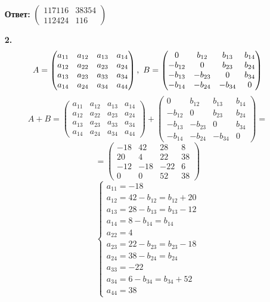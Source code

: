 \documentclass[a4paper]{article}
\newcommand{\mat}[1]{\begin{pmatrix} #1 \end{pmatrix}}
\newcommand{\case}[1]{\begin{cases} #1 \end{cases}}
\newcommand{\ts}{\text{\space}}
\begin{document}
\begin{enumerate}
    \textbf{Ответ: } $\mat{117116 & 38354 \\ 112424 & 116}$

    \item[\textbf{2.}]
    $$A = \mat{a_{11} & a_{12} & a_{13} & a_{14} \\ a_{12} & a_{22} & a_{23} & a_{24} \\ a_{13} & a_{23} & a_{33} & a_{34} \\ a_{14} & a_{24} & a_{34} & a_{44}}, \ts 
    B = \mat{0 & b_{12} & b_{13} & b_{14} \\ -b_{12} & 0 & b_{23} & b_{24} \\ -b_{13} & -b_{23} & 0 & b_{34} \\ -b_{14} & -b_{24} & -b_{34} & 0}$$
    $$A+B = \mat{a_{11} & a_{12} & a_{13} & a_{14} \\ a_{12} & a_{22} & a_{23} & a_{24} \\ a_{13} & a_{23} & a_{33} & a_{34} \\ a_{14} & a_{24} & a_{34} & a_{44}} + 
    \mat{0 & b_{12} & b_{13} & b_{14} \\ -b_{12} & 0 & b_{23} & b_{24} \\ -b_{13} & -b_{23} & 0 & b_{34} \\ -b_{14} & -b_{24} & -b_{34} & 0} = $$
    $$=\mat{-18 & 42 & 28 & 8 \\ 20 & 4 & 22 &38 \\ -12 & -18 & -22 &6 \\ 0 & 0 & 52 & 38}$$
    $$\case{
        a_{11} = -18 \\
        a_{12} = 42 - b_{12} = b_{12}+20\\
        a_{13} = 28 - b_{13} = b_{13}-12\\
        a_{14} = 8 - b_{14} = b_{14}\\
        a_{22} = 4 \\
        a_{23} = 22 - b_{23} = b_{23}-18\\
        a_{24} = 38 - b_{24} = b_{24}\\
        a_{33} = -22 \\
        a_{34} = 6 - b_{34} = b_{34}+52\\
        a_{44} = 38
    }$$


\end{enumerate}
\end{document}
